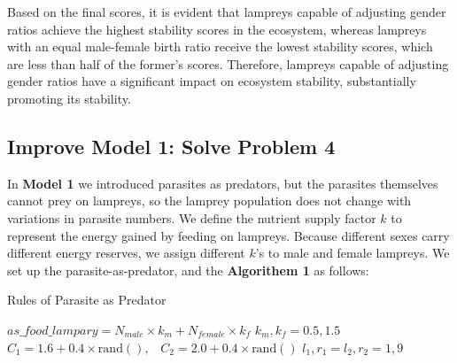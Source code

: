 \documentclass{mcmthesis}
\begin{document}
Based on the final scores, it is evident that lampreys capable of adjusting gender ratios achieve the highest stability scores in the ecosystem, whereas lampreys with an equal male-female birth ratio receive the lowest stability scores, which are less than half of the former's scores. Therefore, lampreys capable of adjusting gender ratios have a significant impact on ecosystem stability, substantially promoting its stability.

\subsection{Improve Model 1: Solve Problem 4}

In \textbf{Model 1} we introduced parasites as predators, but the parasites themselves cannot prey on lampreys, so the lamprey population does not change with variations in parasite numbers. We define the nutrient supply factor $k$ to represent the energy gained by feeding on lampreys. Because different sexes carry different energy reserves, we assign different $k$'s to male and female lampreys. We set up the parasite-as-predator, and the \textbf{Algorithem 1} as follows: 


\begin{algorithm}
\caption{Rules of Parasite as Predator}
\begin{algorithmic}[1]
\State $as\_food\_lampary = N_{male} \times k_m + N_{female} \times k_f$
\State $k_m, k_f = 0.5, 1.5$ 
\State $C_1 = 1.6 + 0.4 \times \text{rand}(), \,\,\,\,\, C_2 = 2.0 + 0.4 \times \text{rand}()$ 
\State $l_1, r_1 = l_2, r_2 = 1, 9$ 
 
        \State {}
    \EndIf
        \State {}
    \Else
        \State {}
    \EndIf
{} 
        \State {}
    \Else
        \State {}
    \EndIf
\EndIf
\end{algorithmic}
\end{algorithm}
\end{document}
